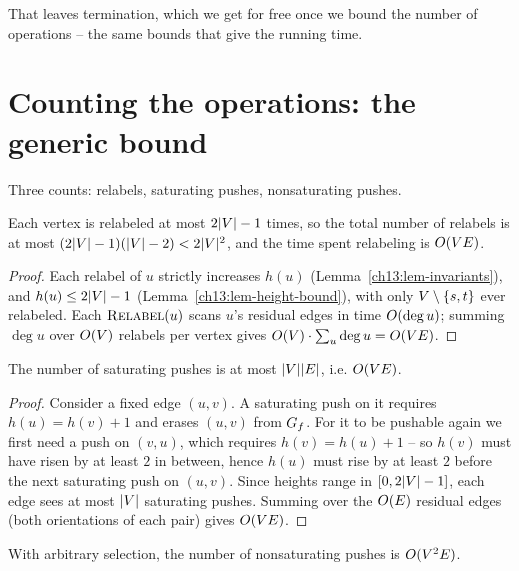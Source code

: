 That leaves termination, which we get for free once we bound the number of operations -- the same bounds that give the running time.

\section{Counting the operations: the generic bound}
\label{ch13:generic-bound}

Three counts: relabels, saturating pushes, nonsaturating pushes.

\begin{lemma}
\label{ch13:lem-relabel-count}
Each vertex is relabeled at most $2\lvert V\rvert-1$ times, so the total number of relabels is at most $(2\lvert V\rvert-1)(\lvert V\rvert-2)<2\lvert V\rvert^2$, and the time spent relabeling is $O(V E)$.
\end{lemma}

\begin{proof}
Each relabel of $u$ strictly increases $h(u)$ (Lemma~\ref{ch13:lem-invariants}), and $h(u)\le 2\lvert V\rvert-1$ (Lemma~\ref{ch13:lem-height-bound}), with only $V\setminus\{s,t\}$ ever relabeled. Each $\textsc{Relabel}(u)$ scans $u$'s residual edges in time $O(\deg u)$; summing $\deg u$ over $O(V)$ relabels per vertex gives $O(V)\cdot\sum_u\deg u=O(VE)$.
\end{proof}

\begin{lemma}
\label{ch13:lem-satpush}
The number of saturating pushes is at most $\lvert V\rvert\lvert E\rvert$, i.e. $O(VE)$.
\end{lemma}

\begin{proof}
Consider a fixed edge $(u,v)$. A saturating push on it requires $h(u)=h(v)+1$ and erases $(u,v)$ from $G_f$. For it to be pushable again we first need a push on $(v,u)$, which requires $h(v)=h(u)+1$ -- so $h(v)$ must have risen by at least $2$ in between, hence $h(u)$ must rise by at least $2$ before the next saturating push on $(u,v)$. Since heights range in $[0,2\lvert V\rvert-1]$, each edge sees at most $\lvert V\rvert$ saturating pushes. Summing over the $O(E)$ residual edges (both orientations of each pair) gives $O(VE)$.
\end{proof}

\begin{lemma}
\label{ch13:lem-nonsatpush}
With arbitrary selection, the number of nonsaturating pushes is $O(V^2E)$.
\end{lemma}

